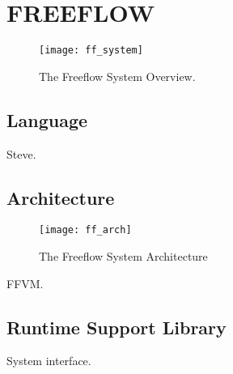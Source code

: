 \chapter{FREEFLOW}
\label{ff}

\begin{figure}[h]
\centering
\texttt{[image: ff\_system]}
\caption{The Freeflow System Overview.}
\label{fig:ff_sys}
\end{figure}

\section{Language}
\label{ff:lang}
Steve.

\section{Architecture}
\label{ff:arch}
\begin{figure}[h]
\centering
\texttt{[image: ff\_arch]}
\caption{The Freeflow System Architecture}
\label{fig:ff_arch}
\end{figure}
FFVM.

\section{Runtime Support Library}
\label{ff:runtime}
System interface.
